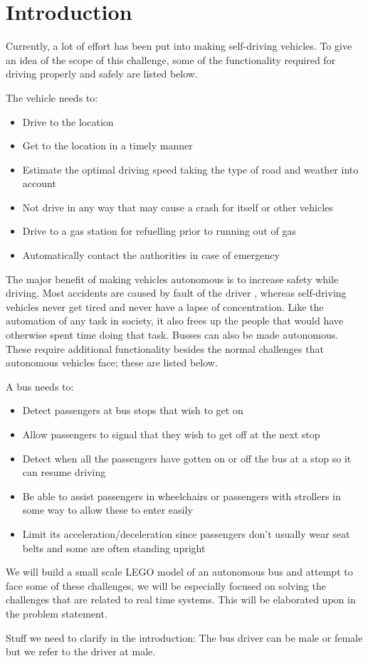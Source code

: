 \chapter{Introduction}

Currently, a lot of effort has been put into making self-driving vehicles. To give an idea of the scope of this challenge, some of the functionality required for driving properly and safely are listed below.

The vehicle needs to:
\begin{itemize}
\item Drive to the location
\item Get to the location in a timely manner
\item Estimate the optimal driving speed taking the type of road and weather into account
\item Not drive in any way that may cause a crash for itself or other vehicles
\item Drive to a gas station for refuelling prior to running out of gas
\item Automatically contact the authorities in case of emergency
\end{itemize}

The major benefit of making vehicles autonomous is to increase safety while driving. Most accidents are caused by fault of the driver \cite{baddriver}, whereas self-driving vehicles never get tired and never have a lapse of concentration. Like the automation of any task in society, it also frees up the people that would have otherwise spent time doing that task. Busses can also be made autonomous. These require additional functionality besides the normal challenges that autonomous vehicles face; these are listed below.

A bus needs to:
\begin{itemize}
\item Detect passengers at bus stops that wish to get on
\item Allow passengers to signal that they wish to get off at the next stop
\item Detect when all the passengers have gotten on or off the bus at a stop so it can resume driving
\item Be able to assist passengers in wheelchairs or passengers with strollers in some way to allow these to enter easily
\item Limit its acceleration/deceleration since passengers don't usually wear seat belts and some are often standing upright
\end{itemize}

We will build a small scale LEGO model of an autonomous bus and attempt to face some of these challenges, we will be especially focused on solving the challenges that are related to real time systems. This will be elaborated upon in the problem statement. 

Stuff we need to clarify in the introduction:
The bus driver can be male or female but we refer to the driver at male.
